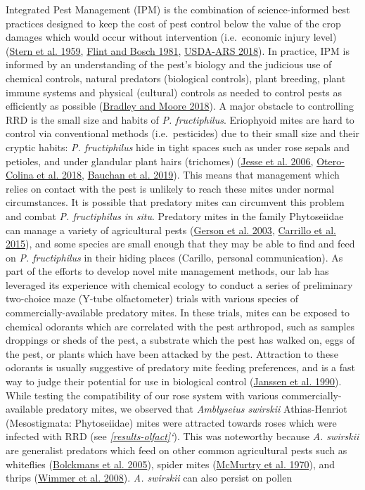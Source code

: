 \documentclass[12pt,final,CPage]{ufthesis}
\begin{document}
{  Integrated Pest Management (IPM) is the combination of science-informed best practices designed to keep the cost of pest control below the value of the crop damages which would occur without intervention (i.e.~economic injury level) (\protect\hyperlink{ref-Stern1959}{Stern et al. 1959}, \protect\hyperlink{ref-Flint1981}{Flint and Bosch 1981}, \protect\hyperlink{ref-USDA2018}{USDA-ARS 2018}). In practice, IPM is informed by an understanding of the pest's biology and the judicious use of chemical controls, natural predators (biological controls), plant breeding, plant immune systems and physical (cultural) controls as needed to control pests as efficiently as possible (\protect\hyperlink{ref-Bradley2018}{Bradley and Moore 2018}). A major obstacle to controlling RRD is the small size and habits of \emph{P. fructiphilus}. Eriophyoid mites are hard to control via conventional methods (i.e.~pesticides) due to their small size and their cryptic habits: \emph{P. fructiphilus} hide in tight spaces such as under rose sepals and petioles, and under glandular plant hairs (trichomes) (\protect\hyperlink{ref-Jesse2006}{Jesse et al. 2006}, \protect\hyperlink{ref-Otero-Colina2018}{Otero-Colina et al. 2018}, \protect\hyperlink{ref-Bauchan2019}{Bauchan et al. 2019}). This means that management which relies on contact with the pest is unlikely to reach these mites under normal circumstances. It is possible that predatory mites can circumvent this problem and combat \emph{P. fructiphilus} \emph{in situ}. Predatory mites in the family Phytoseiidae can manage a variety of agricultural pests (\protect\hyperlink{ref-Gerson2003}{Gerson et al. 2003}, \protect\hyperlink{ref-Carrillo2015}{Carrillo et al. 2015}), and some species are small enough that they may be able to find and feed on \emph{P. fructiphilus} in their hiding places (Carillo, personal communication). As part of the efforts to develop novel mite management methods, our lab has leveraged its experience with chemical ecology to conduct a series of preliminary two-choice maze (Y-tube olfactometer) trials with various species of commercially-available predatory mites. In these trials, mites can be exposed to chemical odorants which are correlated with the pest arthropod, such as samples droppings or sheds of the pest, a substrate which the pest has walked on, eggs of the pest, or plants which have been attacked by the pest. Attraction to these odorants is usually suggestive of predatory mite feeding preferences, and is a fast way to judge their potential for use in biological control (\protect\hyperlink{ref-Janssen1990}{Janssen et al. 1990}). While testing the compatibility of our rose system with various commercially-available predatory mites, we observed that \emph{Amblyseius swirskii} Athias-Henriot (Mesostigmata: Phytoseiidae) mites were attracted towards roses which were infected with RRD (see \emph{\ref{results-olfact}`}). This was noteworthy because \emph{A. swirskii} are generalist predators which feed on other common agricultural pests such as whiteflies (\protect\hyperlink{ref-Bolckmans2005}{Bolckmans et al. 2005}), spider mites (\protect\hyperlink{ref-McMurtry1970}{McMurtry et al. 1970}), and thrips (\protect\hyperlink{ref-Wimmer2008}{Wimmer et al. 2008}). \emph{A. swirskii} can also persist on pollen }
\end{document}
